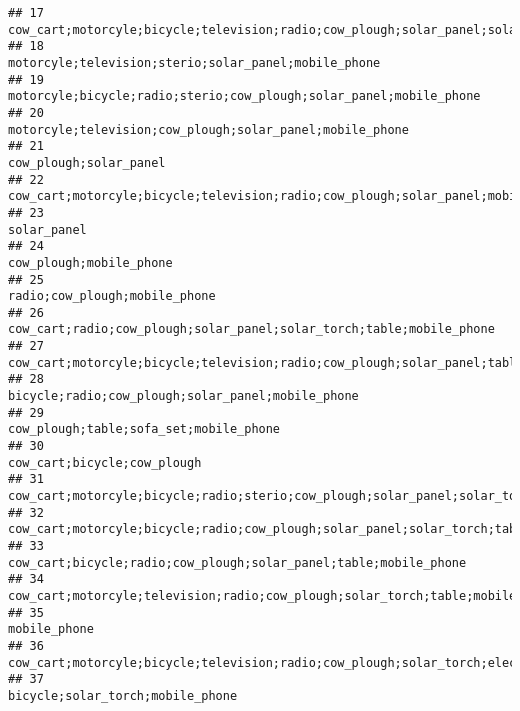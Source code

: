 \documentclass[
]{article}
\begin{document}
\begin{verbatim}
## 17                           cow_cart;motorcyle;bicycle;television;radio;cow_plough;solar_panel;solar_torch;mobile_phone
## 18                                                                  motorcyle;television;sterio;solar_panel;mobile_phone
## 19                                                    motorcyle;bicycle;radio;sterio;cow_plough;solar_panel;mobile_phone
## 20                                                              motorcyle;television;cow_plough;solar_panel;mobile_phone
## 21                                                                                                cow_plough;solar_panel
## 22                                       cow_cart;motorcyle;bicycle;television;radio;cow_plough;solar_panel;mobile_phone
## 23                                                                                                           solar_panel
## 24                                                                                               cow_plough;mobile_phone
## 25                                                                                         radio;cow_plough;mobile_phone
## 26                                                  cow_cart;radio;cow_plough;solar_panel;solar_torch;table;mobile_phone
## 27                                 cow_cart;motorcyle;bicycle;television;radio;cow_plough;solar_panel;table;mobile_phone
## 28                                                                     bicycle;radio;cow_plough;solar_panel;mobile_phone
## 29                                                                                cow_plough;table;sofa_set;mobile_phone
## 30                                                                                           cow_cart;bicycle;cow_plough
## 31                         cow_cart;motorcyle;bicycle;radio;sterio;cow_plough;solar_panel;solar_torch;table;mobile_phone
## 32                                cow_cart;motorcyle;bicycle;radio;cow_plough;solar_panel;solar_torch;table;mobile_phone
## 33                                                      cow_cart;bicycle;radio;cow_plough;solar_panel;table;mobile_phone
## 34                                         cow_cart;motorcyle;television;radio;cow_plough;solar_torch;table;mobile_phone
## 35                                                                                                          mobile_phone
## 36     cow_cart;motorcyle;bicycle;television;radio;cow_plough;solar_torch;electricity;table;sofa_set;mobile_phone;fridge
## 37                                                                                      bicycle;solar_torch;mobile_phone

\end{verbatim}
\end{document}
